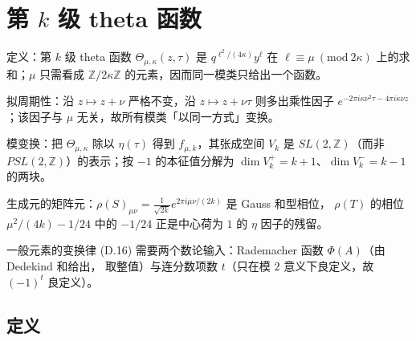
\section{第 $k$ 级 theta 函数} %

\begin{keytakeaways}
  \item 定义：第 $k$ 级 theta 函数 $\Theta_{\mu,\kappa}(z,\tau)$ 是 $q^{\ell^2/(4\kappa)}y^{\ell}$
    在 $\ell\equiv\mu\ (\mathrm{mod}\ 2\kappa)$ 上的求和；$\mu$ 只需看成 $\mathbb{Z}/2\kappa\mathbb{Z}$
    的元素，因而同一模类只给出一个函数。
  \item 拟周期性：沿 $z\mapsto z+\nu$ 严格不变，沿 $z\mapsto z+\nu\tau$ 则多出乘性因子
    $e^{-2\pi i\kappa\nu^2\tau-4\pi i\kappa\nu z}$；该因子与 $\mu$ 无关，故所有模类「以同一方式」变换。
  \item 模变换：把 $\Theta_{\mu,\kappa}$ 除以 $\eta(\tau)$ 得到 $f_{\mu,k}$，其张成空间 $V_k$ 是
    $SL(2,\mathbb{Z})$（而非 $PSL(2,\mathbb{Z})$）的表示；按 $-1$ 的本征值分解为
    $\dim V_k^+=k+1$、$\dim V_k^-=k-1$ 的两块。
  \item 生成元的矩阵元：$\rho(S)_{\mu\nu}=\frac{1}{\sqrt{2k}}e^{2\pi i\mu\nu/(2k)}$ 是 Gauss 和型相位，
    $\rho(T)$ 的相位 $\mu^2/(4k)-1/24$ 中的 $-1/24$ 正是中心荷为 $1$ 的 $\eta$ 因子的残留。
  \item 一般元素的变换律 (D.16) 需要两个数论输入：Rademacher 函数 $\Phi(A)$（由 Dedekind 和给出，
    取整值）与连分数项数 $t$（只在模 $2$ 意义下良定义，故 $(-1)^t$ 良定义）。
\end{keytakeaways}

\subsection{定义} %

